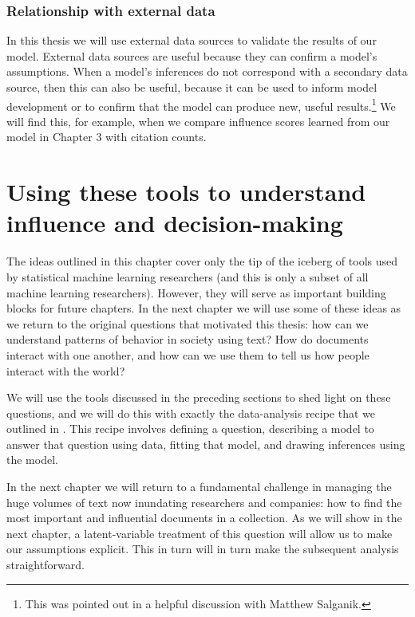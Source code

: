 \subsubsection{Relationship with external data}
In this thesis we will use external data sources to validate the
results of our model.  External data sources are useful because they
can confirm a model's assumptions.  When a model's inferences do not
correspond with a secondary data source, then this can also be useful,
because it can be used to inform model development or to confirm that
the model can produce new, useful results.\footnote{This was
  pointed out in a helpful discussion with Matthew Salganik.}  We will
find this, for example, when we compare influence scores learned from
our model in Chapter 3 with citation counts.

\section{Using these tools to understand influence and decision-making}

The ideas outlined in this chapter cover only the tip of the iceberg
of tools used by statistical machine learning researchers
(and this is only a subset of all machine learning researchers).
However, they will serve as important building blocks for future
chapters.  In the next chapter we will use some of these ideas as we
return to the original questions that motivated this thesis: how can
we understand patterns of behavior in society using text?  How do
documents interact with one another, and how can we use them to tell
us how people interact with the world?

We will use the tools discussed in the preceding sections to shed
light on these questions, and we will do this with exactly the
data-analysis recipe that we outlined in
.  This recipe involves defining a question,
describing a model to answer that question using data, fitting that
model, and drawing inferences using the model.
 
In the next chapter we will return to a fundamental challenge in
managing the huge volumes of text now inundating researchers and
companies: how to find the most important and influential documents in
a collection.  As we will show in the next chapter, a latent-variable
treatment of this question will allow us to make our assumptions
explicit.  This in turn will in turn make the subsequent analysis
straightforward.
